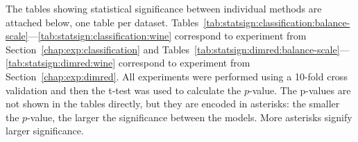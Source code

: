 


\listoffigures

\listofalgorithmes

\listoftables


\printacronyms[include-classes=abbrev,heading=none] %



 \label{chap:attachments}

The tables showing statistical significance between individual methods are attached below, one table per dataset. Tables~\ref{tab:statsign:classification:balance-scale}---\ref{tab:statsign:classification:wine} correspond to experiment from Section~\ref{chap:exp:classification} and Tables~\ref{tab:statsign:dimred:balance-scale}---\ref{tab:statsign:dimred:wine} correspond to experiment from Section~\ref{chap:exp:dimred}. All experiments were performed using a 10-fold cross validation and then the t-test was used to calculate the $p$-value. The p-values are not shown in the tables directly, but they are encoded in asterisks: the smaller the $p$-value, the larger the significance between the models. More asterisks signify larger significance.




\openright

